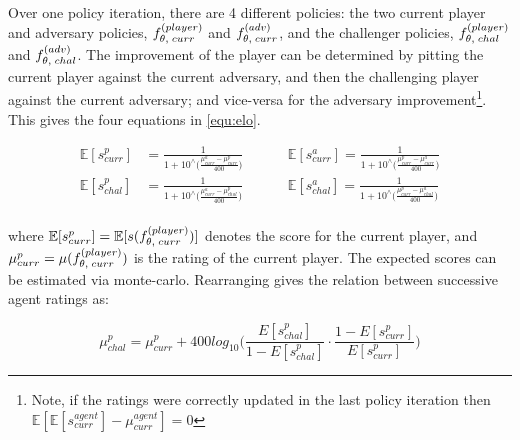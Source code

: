 \documentclass[../main.tex]{subfiles}
\begin{document}
Over one policy iteration, there are 4 different policies: the two current player and adversary policies, $f_{\theta, \; curr}^{(player)}$ and $f_{\theta, \; curr}^{(adv)}$, and the challenger policies,  $f_{\theta, \; chal}^{(player)}$ and $f_{\theta, \; chal}^{(adv)}$. The improvement of the player can be determined by pitting the current player against the current adversary, and then the challenging player against the current adversary; and vice-versa for the adversary improvement\footnote{Note, if the ratings were correctly updated in the last policy iteration then $\mathbb{E}[\mathbb{E}[s_{curr}^{agent}] - \mu_{curr}^{agent}] = 0$}. This gives the four equations in \cref{equ:elo}.

\begin{align}
   \mathbb{E}[s^p_{curr}] &= \frac{1}{1+10^\wedge \big( \frac{\mu^a_{curr} - \mu^p_{curr}}{400} \big)} \hspace{1cm} &\mathbb{E}[s^a_{curr}] = \frac{1}{1+10^\wedge \big( \frac{\mu^p_{curr} - \mu^a_{curr}}{400} \big)}\\
   \mathbb{E}[s^p_{chal}] &= \frac{1}{1+10^\wedge \big( \frac{\mu^a_{curr} - \mu^p_{chal}}{400} \big)} \hspace{1cm} &\mathbb{E}[s^a_{chal}] = \frac{1}{1+10^\wedge \big( \frac{\mu^p_{curr} - \mu^a_{chal}}{400} \big)}\\
\end{align}

where $\mathbb{E}[s^p_{curr}] = \mathbb{E}[s(f_{\theta, \; curr}^{(player)})]$ denotes the score for the current player, and $\mu^p_{curr} = \mu(f_{\theta, \; curr}^{(player)})$ is the rating of the current player. The expected scores can be estimated via monte-carlo. Rearranging gives the relation between successive agent ratings as:

\begin{equation}
   \mu^p_{chal} = \mu^p_{curr} + 400log_{10} \bigg( \frac{{E}[s^p_{chal}]}{1 - {E}[s^p_{chal}]} \cdot \frac{1 - {E}[s^p_{curr}]}{{E}[s^p_{curr}]}    \bigg)
\end{equation}


\appendix
\onlyinsubfile{}
\end{document}
